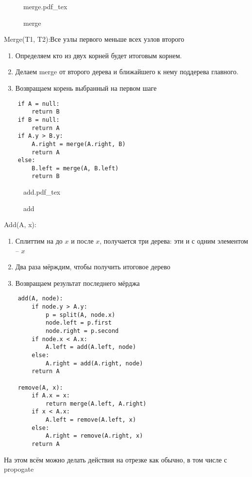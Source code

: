 \documentclass{book}
\theoremstyle{definition}
\newcommand{\incfig}[1]{%
    \def\svgwidth{\columnwidth}
    {#1.pdf_tex}
}
\begin{document}
\begin{figure}[!ht]
    \centering
    \incfig{merge}
    \caption{merge}
    \label{fig:merge}
\end{figure}

Merge(T1, T2):\quad Все узлы первого меньше всех узлов второго
\begin{enumerate}
    \item Определяем кто из двух корней будет итоговым корнем. 
    \item Делаем merge от второго дерева и ближайшего к нему поддерева главного.
    \item Возвращаем корень выбранный на первом шаге
\end{enumerate}

\begin{lstlisting}
    if A = null:
        return B
    if B = null:
        return A
    if A.y > B.y:
        A.right = merge(A.right, B)
        return A
    else:
        B.left = merge(A, B.left)
        return B
\end{lstlisting}

\begin{figure}[!ht]
    \centering
    \incfig{add}
    \caption{add}
    \label{fig:add}
\end{figure}

Add(A, x):
\begin{enumerate}
    \item Сплиттим на до $x$ и после $x$, получается три дерева: эти и с одним элементом -- $x$
    \item Два раза мёрждим, чтобы получить итоговое дерево
    \item Возвращаем результат последнего мёрджа
\end{enumerate}

\begin{lstlisting}
    add(A, node):
        if node.y > A.y:
            p = split(A, node.x)
            node.left = p.first
            node.right = p.second
        if node.x < A.x:
            A.left = add(A.left, node)
        else:
            A.right = add(A.right, node)
        return A

    remove(A, x):
        if A.x = x:
            return merge(A.left, A.right)
        if x < A.x:
            A.left = remove(A.left, x)
        else:
            A.right = remove(A.right, x)
        return A
\end{lstlisting}

На этом всём можно делать действия на отрезке как обычно, в том числе с propogate
\end{document}
